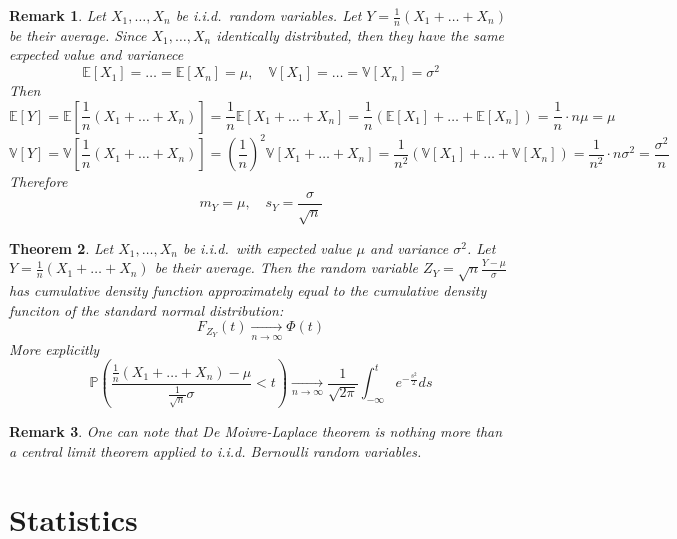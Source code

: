 \documentclass[12pt]{article}
\newtheorem{theorem}{Theorem}[subsection]
\newtheorem{remark}[theorem]{Remark}
\begin{document}
\begin{remark} Let $X_1,\ldots,X_n$ be i.i.d.\ random variables. Let
    $Y=\frac{1}{n}(X_1+\ldots+X_n)$  %
    be their average. Since $X_1,\ldots,X_n$
    identically distributed, then they have the same expected value and
    varianece
    $$
        \mathbb{E}[X_1]
        =\ldots=\mathbb{E}[X_n]             %
        =\mu, \quad \mathbb{V}[X_1]
        =\ldots=\mathbb{V}[X_n]=\sigma^2    %
    $$
    Then
    $$
        \mathbb{E}[Y]
        =\mathbb{E}\left[\frac{1}{n}(X_1+\ldots+X_n)\right]     %
        =\frac{1}{n}\mathbb{E}[X_1+\ldots+X_n]                  %
        =\frac{1}{n}(\mathbb{E}[X_1]+\ldots+\mathbb{E}[X_n])    %
        =\frac{1}{n}\cdot n\mu
        =\mu
    $$
    $$
        \mathbb{V}[Y]
        =\mathbb{V}\left[\frac{1}{n}(X_1+\ldots+X_n)\right]       %
        ={\left(\frac{1}{n}\right)}^2\mathbb{V}[X_1+\ldots+X_n]     %
        =\frac{1}{n^2}(\mathbb{V}[X_1]+\ldots+\mathbb{V}[X_n])    %
        =\frac{1}{n^2}\cdot n\sigma^2
        =\frac{\sigma^2}{n}
    $$
    Therefore
    $$
        m_Y=\mu, \quad s_Y=\frac{\sigma}{\sqrt{n}}
    $$
\end{remark}

\begin{theorem} Let $X_1,\ldots,X_n$ be i.i.d.\ with expected value $\mu$ and
    variance $\sigma^2$. Let $Y=\frac{1}{n}(X_1+\ldots+X_n)$     %
    be their average. Then the random variable
    $Z_Y=\sqrt{n}\frac{Y-\mu}{\sigma}$ has cumulative
    density function approximately equal to the cumulative density funciton of
    the standard normal distribution:
    $$
        F_{Z_Y}(t)\underset{n\to\infty}{\to}\Phi(t)
    $$
    More explicitly
    $$
        \mathbb{P}\left(
        \frac{
            \frac{1}{n}(X_1+\ldots+X_n)-\mu    %
        }{\frac{1}{\sqrt{n}}\sigma}
        <t\right)
        \underset{n\to\infty}{\to}
        \frac{1}{\sqrt{2\pi}}\int_{-\infty}^{t} e^{-\frac{s^2}{2}}ds
    $$
\end{theorem}

\begin{remark} One can note that De Moivre-Laplace theorem is nothing more than
    a central limit theorem applied to i.i.d. Bernoulli random variables.
\end{remark}

\section{Statistics}
\end{document}

